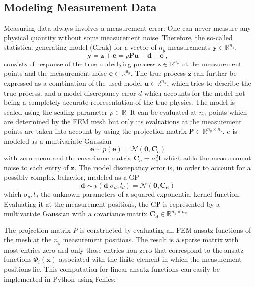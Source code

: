 \documentclass[%
  a4paper,oneside,%
  11pt,%
  smallchapters,
  green,%
  rgb, <cmyk>
  ,]{tubsbook}
\begin{document}
\subsection{Modeling Measurement Data}
Measuring data always involves a measurement error: One can never measure any physical quantity without some measurement noise. Therefore, the so-called statistical generating model (Cirak) for a vector of $n_y$ measurements $\bm{y} \in \mathbb{R}^{n_y}$, 
%
\begin{equation}
\bm{y} = \bm{z} + \bm{e} = \rho \bm{P} \bm{u} + \bm{d} + \bm{e} \; ,
\end{equation}
%
consists of response of the true underlying process $\bm{z} \in \mathbb{R}^{n_y}$ at the measurement points and the measurement noise $\bm{e} \in \mathbb{R}^{n_y}$. The true process $\bm{z}$ can further be expressed as a combination of the used model $\bm{u} \in \mathbb{R}^{n_u}$, which tries to describe the true process, and a model discrepancy error $d$ which accounts for the model not being a completely accurate representation of the true physics. The model is scaled using the scaling parameter $\rho \in \mathbb{R}$. It can be evaluated at $n_u$ points which are determined by the FEM mesh but only its evaluations at the measurement points are taken into account by using the projection matrix $\bm{P} \in \mathbb{R}^{n_y \times n_u}$.
%
$e$ is modeled as a multivariate Gaussian 
%
\begin{equation}
\bm{e} \sim p(\bm{e}) = \mathcal{N}(\bm{0}, \bm{C_e})
\end{equation}
with zero mean and the covariance matrix $\bm{C_e} = \sigma_e^2 \bm{I}$ which adds the measurement noise to each entry of $\bm{z}$.
%
The model discrepancy error is, in order to account for a possibly complex behavior, modeled as a GP
\begin{equation}
\bm{d} \sim p(\bm{d} | \sigma_d, l_d) = \mathcal{N}(\bm{0},\bm{C_d})
\end{equation}
which $\sigma_d, l_d$ the unknown parameters of a squared exponential kernel function. Evaluating it at the measurement positions, the GP is represented by a multivariate Gaussian with a covariance matrix $\bm{C_d} \in \mathbb{R}^{n_y \times n_y}$.

The projection matrix $P$ is constructed by evaluating all FEM ansatz functions of the mesh at the $n_y$ measurement positions. The result is a sparse matrix with most entries zero and only those entries non zero that correspond to the ansatz functions $\Phi_i(\bm{\bm{x}})$ associated with the finite element in which the measurement positions lie.
This computation for linear ansatz functions can easily be implemented in Python using Fenics:
\end{document}
